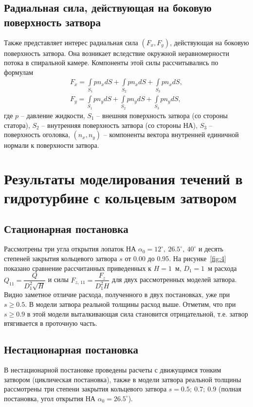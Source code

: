 \subsection{Радиальная сила, действующая на боковую поверхность затвора}
\label{s:442}
Также представляет интерес радиальная сила $(F_x,F_y)$, действующая на боковую поверхность затвора. Она 
возникает вследствие окружной неравномерности потока в спиральной камере. Компоненты этой силы рассчитывались 
по формулам
\begin{gather}
  F_x = \int\limits_{S_1} p n_x dS + \int\limits_{S_2}p n_x dS + \int\limits_{S_3} p n_x dS,
  \label{eq:7} \\
  F_y = \int\limits_{S_1} p n_y dS + \int\limits_{S_2}p n_y dS + \int\limits_{S_3} p n_y dS,
  \label{eq:8}
\end{gather}
где $p$ -- давление жидкости, $S_1$ -- внешняя поверхность затвора (со стороны статора), $S_2$ -- внутренняя 
поверхность затвора (со стороны НА), $S_3$ -- поверхность оголовка, $(n_x,n_y)$ -- компоненты вектора 
внутренней единичной нормали к поверхности затвора.

\section{Результаты моделирования течений в гидротурбине с кольцевым затвором}
\label{s:45}
\subsection{Стационарная постановка}
\label{s:451}
Рассмотрены три угла открытия лопаток НА $\alpha_0=12^\circ,\ 26.5^\circ,\ 40^\circ$ и десять степеней 
закрытия кольцевого затвора $s$ от 0.00 до 0.95. На рисунке~\ref{fig:4} показано сравнение рассчитанных 
приведенных к $H=1$~м, $D_1=1$~м расхода $Q_{11}=\dfrac{Q}{D_1^2\sqrt{H}}$ и 
силы $ F_{z,\, 11}=\dfrac{F_z}{D^2_1 H}$ для двух рассмотренных моделей затвора. Видно заметное отличие 
расхода, полученного в двух постановках, уже при $s\geq 0.5$. В модели затвора реальной толщины расход выше. 
Отметим, что при $s\geq 0.9$ в этой модели выталкивающая сила становится отрицательной, т.е. затвор 
втягивается в проточную часть. 
\subsection{Нестационарная постановка}
\label{s:452}
В нестационарной постановке проведены расчеты с движущимся тонким затвором (циклическая постановка), также в 
модели затвора реальной толщины рассмотрены три степени закрытия кольцевого затвора $s=0.5;\ 0.7;\ 0.9$ 
(полная постановка, угол открытия НА $\alpha_0=26.5^\circ$). 
